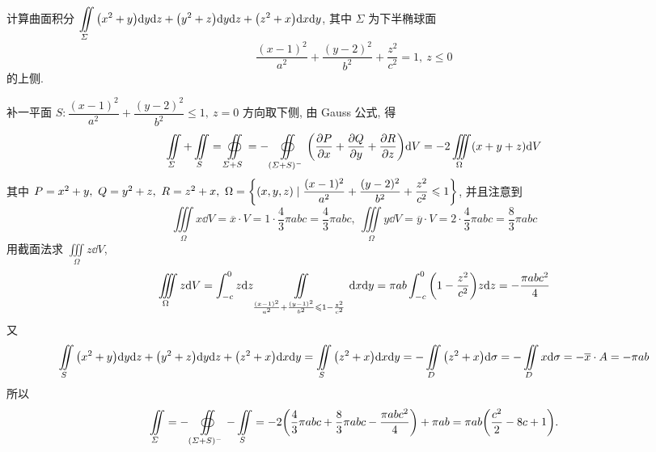 \begin{example}
    计算曲面积分 $\displaystyle\iint\limits_\varSigma \qty(x^2+y)\dd y\dd z+\qty(y^2+z)\dd y\dd z+\qty(z^2+x)\dd x\dd y$, 其中 $\varSigma$ 为下半椭球面
    $$\dfrac{(x-1)^2}{a^2}+\dfrac{(y-2)^2}{b^2}+\dfrac{z^2}{c^2}=1,~z\leqslant 0$$ 的上侧.
\end{example}
\begin{solution}
    补一平面 $S:\dfrac{(x-1)^2}{a^2}+\dfrac{(y-2)^2}{b^2}\leqslant 1,~z=0$ 方向取下侧, 由 Gauss 公式, 得
    $$\iint\limits_\varSigma+\iint\limits_S=\oiint\limits_{\varSigma+S}=-\oiint\limits_{(\varSigma+S)^-}\qty(\pdv{P}{x}+\pdv{Q}{y}+\pdv{R}{z})\dd V=-2\iiint\limits_{\Omega}(x+y+z)\dd V$$
    其中 $P=x^2+y,~Q=y^2+z,~R=z^2+x,~\Omega=\qty{(x,y,z)\mid \dfrac{(x-1)^2}{a^2}+\dfrac{(y-2)^2}{b^2}+\dfrac{z^2}{c^2}\leqslant 1}$, 并且注意到
    $$\iiint\limits_\Omega x\dd V=\overline{x}\cdot V=1\cdot\dfrac{4}{3}\pi abc=\dfrac{4}{3}\pi abc,~\iiint\limits_{\Omega}y\dd V=\overline{y}\cdot V=2\cdot\dfrac{4}{3}\pi abc=\dfrac{8}{3}\pi abc$$
    用截面法求 $\displaystyle\iiint\limits_\Omega z\dd V$,
    $$\iiint\limits_\Omega z\dd V=\int_{-c}^{0}z\dd z\iint\limits_{\frac{(x-1)^2}{a^2}+\frac{(y-1)^2}{b^2}\leqslant 1-\frac{z^2}{c^2}}\dd x\dd y=\pi ab\int_{-c}^{0}\qty(1-\dfrac{z^2}{c^2})z\dd z=-\dfrac{\pi abc^2}{4}$$
    又 $$\iint\limits_{S}\qty(x^2+y)\dd y\dd z+\qty(y^2+z)\dd y\dd z+\qty(z^2+x)\dd x\dd y=\iint\limits_{S}\qty(z^2+x)\dd x\dd y=-\iint\limits_D\qty(z^2+x)\dd \sigma=-\iint\limits_Dx\dd \sigma=-\overline{x}\cdot A=-\pi ab$$
    所以 $$\iint\limits_\varSigma=-\oiint\limits_{(\varSigma+S)^-}-\iint\limits_S=-2\qty(\dfrac{4}{3}\pi abc+\dfrac{8}{3}\pi abc-\dfrac{\pi abc^2}{4})+\pi ab=\pi ab\qty(\dfrac{c^2}{2}-8c+1).$$
\end{solution}

